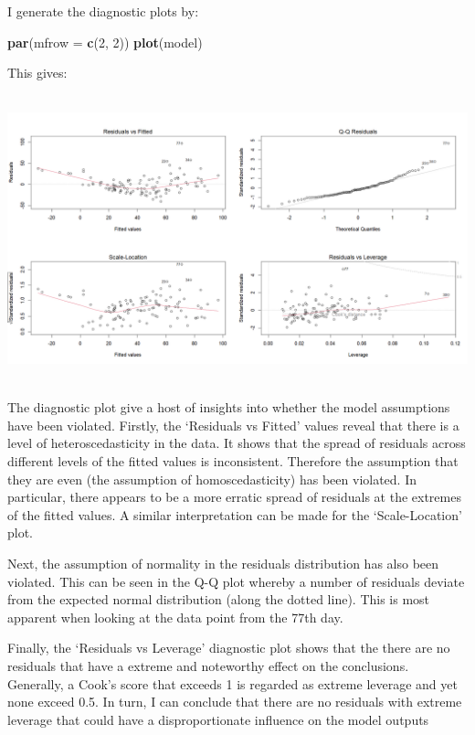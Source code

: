 \documentclass[
]{article}
\newenvironment{Shaded}{\begin{snugshade}}{\end{snugshade}}
\newcommand{\AttributeTok}[1]{\textcolor[rgb]{0.13,0.29,0.53}{#1}}
\newcommand{\DecValTok}[1]{\textcolor[rgb]{0.00,0.00,0.81}{#1}}
\newcommand{\FunctionTok}[1]{\textcolor[rgb]{0.13,0.29,0.53}{\textbf{#1}}}
\newcommand{\NormalTok}[1]{#1}
\begin{document}
I generate the diagnostic plots by:

\begin{Shaded}
\begin{Highlighting}[]
\FunctionTok{par}\NormalTok{(}\AttributeTok{mfrow =} \FunctionTok{c}\NormalTok{(}\DecValTok{2}\NormalTok{, }\DecValTok{2}\NormalTok{))}
\FunctionTok{plot}\NormalTok{(model)}
\end{Highlighting}
\end{Shaded}

\hfill\break
This gives:\\
\strut \\
\includegraphics{images/diagnostic_plots.png}\\
\strut \\
The diagnostic plot give a host of insights into whether the model
assumptions have been violated. Firstly, the `Residuals vs Fitted'
values reveal that there is a level of heteroscedasticity in the data.
It shows that the spread of residuals across different levels of the
fitted values is inconsistent. Therefore the assumption that they are
even (the assumption of homoscedasticity) has been violated. In
particular, there appears to be a more erratic spread of residuals at
the extremes of the fitted values. A similar interpretation can be made
for the `Scale-Location' plot.

Next, the assumption of normality in the residuals distribution has also
been violated. This can be seen in the Q-Q plot whereby a number of
residuals deviate from the expected normal distribution (along the
dotted line). This is most apparent when looking at the data point from
the 77th day.

Finally, the `Residuals vs Leverage' diagnostic plot shows that the
there are no residuals that have a extreme and noteworthy effect on the
conclusions. Generally, a Cook's score that exceeds 1 is regarded as
extreme leverage and yet none exceed 0.5. In turn, I can conclude that
there are no residuals with extreme leverage that could have a
disproportionate influence on the model outputs
\end{document}
